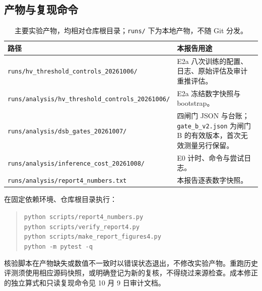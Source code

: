 \documentclass[11pt,a4paper,UTF8,fontset=fandol]{ctexart}
\newcommand{\code}[1]{\nolinkurl{#1}}
\begin{document}
\subsection{产物与复现命令}

\begin{table}[H]
\centering\footnotesize
\caption{主要实验产物，均相对仓库根目录；\code{runs/} 下为本地产物，不随 Git 分发。}
\begin{tabularx}{\linewidth}{lY}\toprule
路径 & 本报告用途\\\midrule
\code{runs/hv\_threshold\_controls\_20261006/} & E2a 八次训练的配置、日志、原始评估及审计重推评估。\\
\code{runs/analysis/hv\_threshold\_controls\_20261006/} & E2a 冻结数字快照与 bootstrap。\\
\code{runs/analysis/dsb\_gates\_20261007/} & 四闸门 JSON 与台账；\code{gate\_b\_v2.json} 为闸门 B 的有效版本，首次无效测量另行保留。\\
\code{runs/analysis/inference\_cost\_20261008/} & E0 计时、命令与尝试日志。\\
\code{runs/analysis/report4\_numbers.txt} & 本报告逐表数字快照。\\\bottomrule
\end{tabularx}
\end{table}

在固定依赖环境、仓库根目录执行：
\begin{quote}\small
\texttt{python scripts/report4\_numbers.py}\\
\texttt{python scripts/verify\_report4.py}\\
\texttt{python scripts/make\_report\_figures4.py}\\
\texttt{python -m pytest -q}
\end{quote}
核验脚本在产物缺失或数值不一致时以错误状态退出，不修改实验产物。重跑历史评测须使用相应源码快照，或明确登记为新的复核，不得绕过来源检查。成本修正的独立算式和只读复现命令见 10 月 9 日审计文档。
\end{document}
